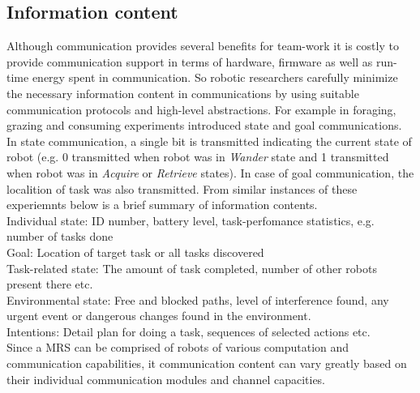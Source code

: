 \subsection{Information content}
Although communication provides several benefits for team-work it is costly to provide communication support in terms of hardware, firmware as well as run-time energy spent in communication. So robotic researchers carefully  minimize the necessary information content in communications by using suitable communication protocols and high-level abstractions. For example in foraging, grazing and consuming experiments   introduced state and goal communications. In state communication, a single bit is transmitted indicating the current state of robot (e.g. 0 transmitted when robot was in {\em Wander} state and 1 transmitted when robot was in {\em Acquire} or {\em Retrieve} states). In case of goal communication, the localition of task was also transmitted. From similar instances of these experiemnts below is a brief summary of information contents.\\
Individual state: ID number, battery level, task-perfomance statistics, e.g. number of tasks done\\
Goal: Location of target task or all tasks discovered\\
Task-related state: The amount of task completed, number of other robots present there etc.\\
Environmental state: Free and blocked paths, level of interference found, any urgent event or dangerous changes found in the environment.\\
Intentions: Detail plan for doing a task, sequences of selected actions etc.\\
Since a MRS can be comprised of robots of various computation and communication capabilities, it communication content can vary greatly based on their individual communication modules and channel capacities.
